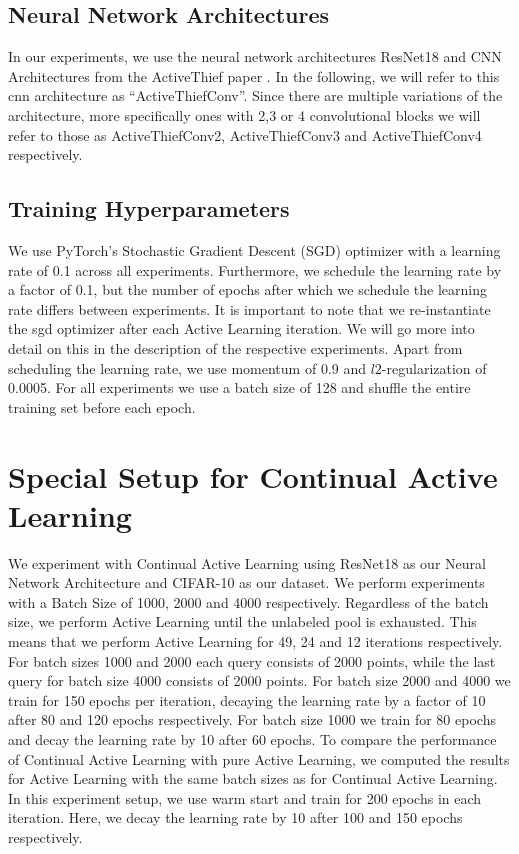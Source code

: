 \subsection{Neural Network Architectures}
\label{sec:ExperimentSetup:NNArchitectures}
In our experiments, we use the neural network architectures ResNet18 \cite{he2016deep} and CNN Architectures from the ActiveThief paper \cite{pal2020activethief}.
In the following, we will refer to this \gls{cnn} architecture as \enquote{ActiveThiefConv}. Since there are multiple variations of the architecture, more specifically ones with
2,3 or 4 convolutional blocks we will refer to those as ActiveThiefConv2, ActiveThiefConv3 and ActiveThiefConv4 respectively.


\subsection{Training Hyperparameters}
\label{sec:ExperimentSetup:Hyperparameters}
We use PyTorch's Stochastic Gradient Descent (\gls{SGD}) optimizer with a learning rate of 0.1 across all experiments. Furthermore, we schedule the learning rate by a factor of 0.1, but the number of
epochs after which we schedule the learning rate differs between experiments. It is important to note that we re-instantiate the \gls{sgd} optimizer after each Active Learning
iteration. We will go more into detail on this in the description of the respective experiments. Apart from scheduling the learning rate, we use momentum \cite{cutkosky2020momentum}
of 0.9 and $l2$-regularization of 0.0005. For all experiments we use a batch size of 128 and shuffle the entire training set before each epoch.


\section{Special Setup for Continual Active Learning}
\label{sec:Methodology:CALsetup}
We experiment with Continual Active Learning using ResNet18 as our Neural Network Architecture and CIFAR-10 as our dataset. We perform experiments with a Batch Size of 1000,
2000 and 4000 respectively. Regardless of the batch size, we perform Active Learning until the unlabeled pool is exhausted. This means that we perform Active Learning for
49, 24 and 12 iterations respectively. For batch sizes 1000 and 2000 each query consists of 2000 points, while the last query for batch size 4000 consists of 2000 points.
For batch size 2000 and 4000 we train for 150 epochs per iteration, decaying the learning rate by a factor of 10 after 80 and 120 epochs respectively. For batch size 1000 we
train for 80 epochs and decay the learning rate by 10 after 60 epochs. To compare the performance of Continual Active Learning with pure Active Learning, we computed the results
for Active Learning with the same batch sizes as for Continual Active Learning. In this experiment setup, we use warm start and train for 200 epochs in each iteration. Here, we
decay the learning rate by 10 after 100 and 150 epochs respectively.

